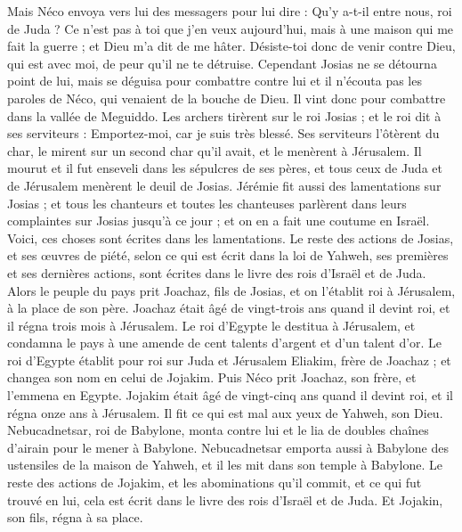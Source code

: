 \begin{multicols}{2}
Mais Néco envoya vers lui des messagers pour lui dire : Qu'y a-t-il entre nous, roi de Juda ? Ce n'est pas à toi que j'en veux aujourd'hui, mais à une maison qui me fait la guerre ; et Dieu m'a dit de me hâter. Désiste-toi donc de venir contre Dieu, qui est avec moi, de peur qu'il ne te détruise.
Cependant Josias ne se détourna point de lui, mais se déguisa pour combattre contre lui et il n'écouta pas les paroles de Néco, qui venaient de la bouche de Dieu. Il vint donc pour combattre dans la vallée de Meguiddo.
Les archers tirèrent sur le roi Josias ; et le roi dit à ses serviteurs : Emportez-moi, car je suis très blessé.
Ses serviteurs l'ôtèrent du char, le mirent sur un second char qu'il avait, et le menèrent à Jérusalem. Il mourut et il fut enseveli dans les sépulcres de ses pères, et tous ceux de Juda et de Jérusalem menèrent le deuil de Josias.
Jérémie fit aussi des lamentations sur Josias ; et tous les chanteurs et toutes les chanteuses parlèrent dans leurs complaintes sur Josias jusqu'à ce jour ; et on en a fait une coutume en Israël. Voici, ces choses sont écrites dans les lamentations.
Le reste des actions de Josias, et ses œuvres de piété, selon ce qui est écrit dans la loi de Yahweh,
ses premières et ses dernières actions, sont écrites dans le livre des rois d'Israël et de Juda.
\VerseOne{}Alors le peuple du pays prit Joachaz, fils de Josias, et on l'établit roi à Jérusalem, à la place de son père.
Joachaz était âgé de vingt-trois ans quand il devint roi, et il régna trois mois à Jérusalem.
Le roi d'Egypte le destitua à Jérusalem, et condamna le pays à une amende de cent talents d'argent et d'un talent d'or.
Le roi d'Egypte établit pour roi sur Juda et Jérusalem Eliakim, frère de Joachaz ; et changea son nom en celui de Jojakim. Puis Néco prit Joachaz, son frère, et l'emmena en Egypte.
Jojakim était âgé de vingt-cinq ans quand il devint roi, et il régna onze ans à Jérusalem. Il fit ce qui est mal aux yeux de Yahweh, son Dieu.
Nebucadnetsar, roi de Babylone, monta contre lui et le lia de doubles chaînes d'airain pour le mener à Babylone.
Nebucadnetsar emporta aussi à Babylone des ustensiles de la maison de Yahweh, et il les mit dans son temple à Babylone.
Le reste des actions de Jojakim, et les abominations qu'il commit, et ce qui fut trouvé en lui, cela est écrit dans le livre des rois d'Israël et de Juda. Et Jojakin, son fils, régna à sa place.

\end{multicols}
